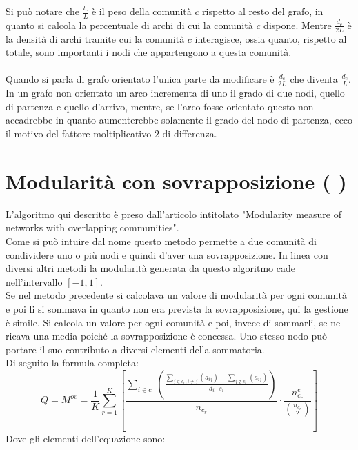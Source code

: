 %
Si può notare che $\frac{l_c}{L}$ è il peso della comunità $c$ rispetto al resto del grafo, in quanto si calcola la percentuale di archi di cui la comunità $c$ dispone. Mentre $\frac{d_c}{2L}$ è la densità di archi tramite cui la comunità $c$ interagisce, ossia quanto, rispetto al totale, sono importanti i nodi che appartengono a questa comunità.\\
\\
Quando si parla di grafo orientato l'unica parte da modificare è $\frac{d_c}{2L}$ che diventa $\frac{d_c}{L}$. In un grafo non orientato un arco incrementa di uno il grado di due nodi, quello  di partenza e quello d'arrivo, mentre, se l'arco fosse orientato questo non accadrebbe in quanto aumenterebbe solamente il grado del nodo di partenza, ecco il motivo del fattore moltiplicativo $2$ di differenza.
%
%
\section{Modularità con sovrapposizione ( \mover )}
L'algoritmo qui descritto è preso dall'articolo intitolato "Modularity measure of networks with overlapping communities"\cite{M-over_paper}.\\
Come si può intuire dal nome questo metodo permette a due comunità di condividere uno o più nodi e quindi d'aver una sovrapposizione. In linea con diversi altri metodi la modularità generata da questo algoritmo cade nell'intervallo $[-1, 1]$.\\
Se nel metodo precedente si calcolava un valore di modularità per ogni comunità e poi li si sommava in quanto non era prevista la sovrapposizione, qui la gestione è simile. Si calcola un valore per ogni comunità e poi, invece di sommarli, se ne ricava una media poiché la sovrapposizione è concessa. Uno stesso nodo può portare il suo contributo a diversi elementi della sommatoria.\\
Di seguito la formula completa:
\begin{equation}
	Q = M^{ov} = \frac{1}{K} 
	\sum_{r=1}^{K} \left[
		\frac
			{\sum\limits_{i \in c_r} 
				\left( \frac
					{
						\sum\limits_{j \in c_r, i \neq j} \left( a_{ij} \right) 
						- 
						\sum\limits_{j \notin c_r} \left( a_{ij} \right) 
					} 
					{d_i \cdot s_i} 
				\right) } 
			{n_{c_r}}
		\cdot
		\frac{ n^e_{c_r} }{ \binom{n_{c_r}}{2} } 
	\right]
	\label{eq:m_over}
\end{equation}
Dove gli elementi dell'equazione sono:
